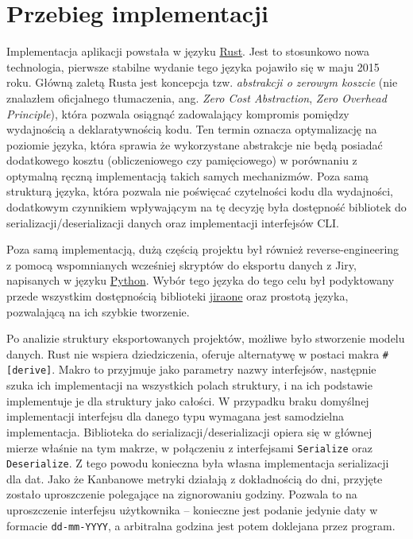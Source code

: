 \section{Przebieg implementacji}
Implementacja aplikacji powstała w języku \href{https://www.rust-lang.org/}{Rust}.
Jest to stosunkowo nowa technologia, pierwsze stabilne wydanie tego języka pojawiło się w maju 2015 roku.
Główną zaletą Rusta jest koncepcja tzw. \textit{abstrakcji o zerowym koszcie} (nie znalazłem oficjalnego tłumaczenia, ang. \textit{Zero Cost Abstraction}, \textit{Zero Overhead Principle}), która pozwala
osiągnąć zadowalający kompromis pomiędzy wydajnością a deklaratywnością kodu. Ten termin oznacza optymalizację na poziomie języka, która sprawia że wykorzystane abstrakcje nie będą posiadać dodatkowego kosztu (obliczeniowego czy pamięciowego) w porównaniu
z optymalną ręczną implementacją takich samych mechanizmów.
Poza samą strukturą języka, która pozwala nie poświęcać czytelności kodu dla wydajności, dodatkowym czynnikiem wpływającym na tę decyzję była dostępność bibliotek do serializacji/deserializacji danych oraz implementacji interfejsów CLI. \cite{RustSerde} \cite{RustClap}

Poza samą implementacją, dużą częścią projektu był również reverse-engineering z pomocą wspomnianych wcześniej skryptów do eksportu danych z Jiry, napisanych w języku \href{https://www.python.org/}{Python}.
Wybór tego języka do tego celu był podyktowany przede wszystkim dostępnością biblioteki \href{https://pypi.org/project/jiraone/}{jiraone} oraz prostotą języka, pozwalającą na ich szybkie tworzenie.

Po analizie struktury eksportowanych projektów, możliwe było stworzenie modelu danych.
Rust nie wspiera dziedziczenia, oferuje alternatywę w postaci makra \texttt{\#[derive]}. Makro to przyjmuje jako parametry
nazwy interfejsów, następnie szuka ich implementacji na wszystkich polach struktury, i na ich podstawie implementuje je dla struktury jako
całości. W przypadku braku domyślnej implementacji interfejsu dla danego typu wymagana jest samodzielna implementacja.
Biblioteka do serializacji/deserializacji opiera się w głównej mierze właśnie na tym makrze, w połączeniu z interfejsami \texttt{Serialize} oraz \texttt{Deserialize}.
Z tego powodu konieczna była własna implementacja serializacji dla dat.
Jako że Kanbanowe metryki działają z dokładnością do dni, przyjęte zostało uproszczenie polegające na zignorowaniu godziny.
Pozwala to na uproszczenie interfejsu użytkownika -- konieczne jest podanie jedynie daty w formacie \texttt{dd-mm-YYYY}, a arbitralna
godzina jest potem doklejana przez program.

